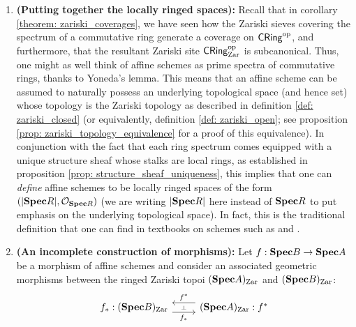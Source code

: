                 \begin{remark} \label{remark: affine_schemes_are_locally_ringed_spaces}
                    \noindent
                    \begin{enumerate}
                        \item \textbf{(Putting together the locally ringed spaces):} Recall that in corollary \ref{theorem: zariski_coverages}, we have seen how the Zariski sieves covering the spectrum of a commutative ring generate a coverage on $\mathsf{CRing}^{\mathrm{op}}$, and furthermore, that the resultant Zariski site $\mathsf{CRing}^{\mathrm{op}}_{\mathrm{Zar}}$ is subcanonical. Thus, one might as well think of affine schemes as prime spectra of commutative rings, thanks to Yoneda's lemma. This means that an affine scheme can be assumed to naturally possess an underlying topological space (and hence set) whose topology is the Zariski topology as described in definition \ref{def: zariski_closed} (or equivalently, definition \ref{def: zariski_open}; see proposition \ref{prop: zariski_topology_equivalence} for a proof of this equivalence). In conjunction with the fact that each ring spectrum comes equipped with a unique structure sheaf whose stalks are local rings, as established in proposition \ref{prop: structure_sheaf_uniqueness}, this implies that one can \textit{define} affine schemes to be locally ringed spaces of the form $(|\mathbf{Spec} R|, \mathcal{O}_{\mathbf{Spec} R})$ (we are writing $|\mathbf{Spec} R|$ here instead of $\mathbf{Spec} R$ to put emphasis on the underlying topological space). In fact, this is the traditional definition that one can find in textbooks on schemes such as \cite{ega1} and \cite{hartshorne}. 
                        \item \textbf{(An incomplete construction of morphisms):} Let $f: \mathbf{Spec} B \to \mathbf{Spec} A$ be a morphism of affine schemes and consider an associated geometric morphisms between the ringed Zariski topoi $(\mathbf{Spec} A)_{\mathrm{Zar}}$ and $(\mathbf{Spec} B)_{\mathrm{Zar}}$:
                            $$
                                \begin{tikzcd}
                                	{f_*: (\Spec B)_{\Zar}} & {(\Spec A)_{\Zar}: f^*}
                                	\arrow[""{name=0, anchor=center, inner sep=0}, "f_*"', shift right=2, from=1-1, to=1-2]
                                	\arrow[""{name=1, anchor=center, inner sep=0}, "f^*"', shift right=2, from=1-2, to=1-1]
                                	\arrow["\dashv"{anchor=center, rotate=-90}, draw=none, from=1, to=0]
                                \end{tikzcd}
$$
\end{enumerate}
\end{remark}

